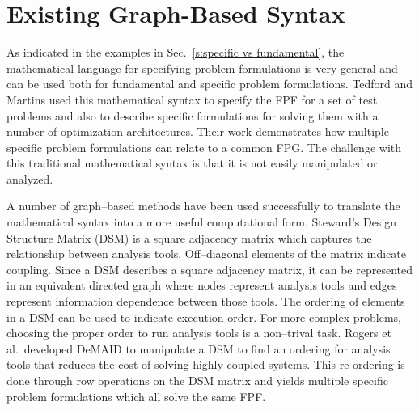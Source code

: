 \section{Existing Graph-Based Syntax}
	\label{s:existing syntax}
    As indicated in the examples in Sec.~\ref{s:specific vs fundamental}, the mathematical language for specifying problem formulations is very general and can be used both for 
    fundamental and specific problem formulations. Tedford and Martins used this mathematical syntax to specify the 
    FPF for a set of test problems and also to describe specific formulations for solving them with a 
    number of optimization architectures\cite{Tedford2009}. Their work demonstrates how multiple specific 
    problem formulations can relate to a common FPG. The challenge with this 
    traditional mathematical syntax is that it is not easily manipulated or analyzed. 

    A number of graph--based methods have been used successfully to translate the 
    mathematical syntax into a more useful computational form. 
    Steward's Design Structure Matrix (DSM) is a square adjacency matrix which captures the relationship between analysis tools.
    Off--diagonal elements of the matrix indicate coupling\cite{Steward1981}. Since a DSM describes a square adjacency matrix, 
    it can be represented in an equivalent directed graph where nodes represent analysis tools and 
    edges represent information dependence between those tools. The ordering of elements in a DSM can be used to indicate 
    execution order.  For more complex problems, choosing the proper order to run analysis tools is a non--trival task. 
    Rogers et al.~developed DeMAID to manipulate a DSM to find an ordering for analysis tools that 
    reduces the cost of solving highly coupled systems\cite{rogers1996,rogers1996demaid}. This re-ordering is done through 
    row operations on the DSM matrix and yields multiple specific problem 
    formulations which all solve the same FPF. 
    
